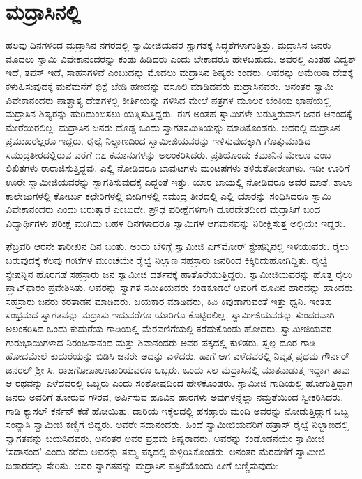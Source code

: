 
\chapter{ಮದ್ರಾಸಿನಲ್ಲಿ  }

 ಹಲವು ದಿನಗಳಿಂದ ಮದ್ರಾಸಿನ ನಗರದಲ್ಲಿ ಸ್ವಾಮೀಜಿಯವರ ಸ್ವಾಗತಕ್ಕೆ ಸಿದ್ಧತೆಗಳಾಗುತ್ತಿತ್ತು. ಮದ್ರಾಸಿನ ಜನರು ಮೊದಲು ಸ್ವಾಮಿ ವಿವೇಕಾನಂದರನ್ನು ಕಂಡು ಹಿಡಿದರು ಎಂದು ಬೇಕಾದರೂ ಹೇಳಬಹುದು. ಅವರಲ್ಲಿ ಎಂತಹ ವಿದ್ವತ್ ಇದೆ, ತಪಸ್ ಇದೆ, ಸಾಹಸಗಳಿವೆ ಎಂಬುದನ್ನು ಮೊದಲು ಮದ್ರಾಸಿನ ಶಿಷ್ಯರು ಕಂಡರು. ಅವರನ್ನು ಅಮೇರಿಕಾ ದೇಶಕ್ಕೆ ಕಳುಹಿಸುವುದಕ್ಕೆ ಮನೆಮನೆಗೆ ಭಿಕ್ಷೆ ಬೇಡಿ ಹಣವನ್ನು ವಸೂಲಿ ಮಾಡಿದವರು ಮದ್ರಾಸಿನವರು. ಅನಂತರ ಸ್ವಾಮಿ ವಿವೇಕಾನಂದರು ಪಾಶ್ಚಾತ್ಯ ದೇಶಗಳಲ್ಲಿ ಕೀರ್ತಿಯನ್ನು ಗಳಿಸಿದ ಮೇಲೆ ಪತ್ರಗಳ ಮೂಲಕ ಬೆಂಕಿಯ ಭಾಷೆಯಲ್ಲಿ ಮದ್ರಾಸಿನ ಶಿಷ್ಯರನ್ನು ಹುರಿದುಂಬಿಸಲು ಯತ್ನಿಸುತ್ತಿದ್ದರು. ಈಗ ಅಂತಹ ಸ್ವಾಮಿಗಳೇ ಬರುತ್ತಿರುವಾಗ ಜನರ ಆನಂದಕ್ಕೆ ಮೇರೆಯಿರಲಿಲ್ಲ. ಮದ್ರಾಸಿನ ಜನರು ದೊಡ್ಡ ಒಂದು ಸ್ವಾಗತಸಮಿತಿಯನ್ನು ಮಾಡಿಕೊಂಡರು. ಅದರಲ್ಲಿ ಮದ್ರಾಸಿನ ಪ್ರಮುಖರೆಲ್ಲರೂ ಇದ್ದರು. ರೈಲ್ವೆ ನಿಲ್ದಾಣದಿಂದ ಸ್ವಾಮೀಜಿಯವರನ್ನು ಇಳಿಸುವುದಕ್ಕಾಗಿ ಗೊತ್ತುಮಾಡಿದ ಸಮುದ್ರತೀರದಲ್ಲಿರುವ  ವರೆಗೆ ೧೭ ಕಮಾನುಗಳನ್ನು ಅಲಂಕರಿಸಿದರು. ಪ್ರತಿಯೊಂದು ಕಮಾನಿನ ಮೇಲೂ  ಎಂಬ ಲಿಖಿತಗಳು ರಾರಾಜಿಸುತ್ತಿದ್ದವು. ಎಲ್ಲಿ ನೋಡಿದರೂ ಬಾವುಟಗಳು ಮಂಟಪಗಳು ತಳಿರುತೋರಣಗಳು. ಇಡೀ ಊರಿಗೆ ಊರೇ ಸ್ವಾಮೀಜಿಯವರನ್ನು ಸ್ವಾಗತಿಸುವುದಕ್ಕೆ ಎದ್ದಂತೆ ಇತ್ತು. ಯಾರ ಬಾಯಲ್ಲಿ ನೋಡಿದರೂ ಅವರ ಮಾತೆ. ಶಾಲಾ ಕಾಲೇಜುಗಳಲ್ಲಿ ಕೋರ್ಟು ಕಛೇರಿಗಳಲ್ಲಿ ಬೀದಿಗಳಲ್ಲಿ ಸಮುದ್ರ ತೀರದಲ್ಲಿ ಎಲ್ಲಿ ಯಾರನ್ನು ಸಂಧಿಸಿದರೂ ಸ್ವಾಮಿ ವಿವೇಕಾನಂದರು ಎಂದು ಬರುತ್ತಾರೆ ಎಂಬುದೇ. ಪ್ರೌಢ ಪರೀಕ್ಷೆಗಳಿಗಾಗಿ ದೂರದೇಶದಿಂದ ಮದ್ರಾಸಿಗೆ ಬಂದ ವಿದ್ಯಾರ್ಥಿಗಳು ಪರೀಕ್ಷೆ ಮುಗಿದು ಬಹಳ ದಿನಗಳಾದರೂ ಸ್ವಾಮಿಗಳ ಆಗಮನವನ್ನು ನಿರೀಕ್ಷಿಸುತ್ತ ಅಲ್ಲಿಯೇ ಇದ್ದರು. 

 ಫೆಬ್ರವರಿ ಆರನೇ ತಾರೀಖಿನ ದಿನ ಬಂತು. ಅಂದು ಬೆಳಿಗ್ಗೆ ಸ್ವಾಮೀಜಿ ಎಗ್‍ಮೋರ್ ಸ್ಟೇಷನ್ನಿನಲ್ಲಿ ಇಳಿಯುವರು. ರೈಲು ಬರುವುದಕ್ಕೆ ಕೆಲವು ಗಂಟೆಗಳ ಮುಂಚೆಯೇ ರೈಲ್ವೆ ನಿಲ್ದಾಣ ಸಹಸ್ರಾರು ಜನರಿಂದ ಕಿಕ್ಕಿರಿದುಹೋಗಿದ್ದಿತು. ರೈಲ್ವೆ ಸ್ಟೇಷನ್ನಿನ ಹೊರಗಡೆ ಸಹಸ್ರಾರು ಜನ ಸ್ವಾಮೀಜಿ ದರ್ಶನಕ್ಕೆ ಹಾತೊರೆಯುತ್ತಿದ್ದರು. ಸ್ವಾಮೀಜಿಯವರನ್ನು ಹೊತ್ತ ರೈಲು ಪ್ಲಾಟ್‍ಫಾರಂ ಪ್ರವೇಶಿಸಿತು. ಅವರನ್ನು ಸ್ವಾಗತ ಸಮಿತಿಯವರು ಕಂಡಕೂಡಲೆ ಅವರಿಗೆ ಹೂವಿನ ಹಾರವನ್ನು ಹಾಕಿದರು. ಸಹಸ್ರಾರು ಜನರು ಕರತಾಡನ ಮಾಡಿದರು. ಜಯಕಾರ ಮಾಡಿದರು, ಕಿವಿ ಕಿವುಡಾಗುವಂತೆ ಇತ್ತು ಧ್ವನಿ. ಇಂತಹ ಸಂಭ್ರಮದ ಸ್ವಾಗತವನ್ನು ಮದ್ರಾಸು ಇದುವರೆಗೂ ಯಾರಿಗೂ ಕೊಟ್ಟಿರಲಿಲ್ಲ. ಸ್ವಾಮೀಜಿಯವರನ್ನು ಸುಂದರವಾಗಿ ಅಲಂಕರಿಸಿದ ಒಂದು ಕುದುರೆಯ ಗಾಡಿಯಲ್ಲಿ ಮೆರವಣಿಗೆಯಲ್ಲಿ ಕರೆದುಕೊಂಡು ಹೋದರು. ಸ್ವಾಮೀಜಿಯವರ ಗುರುಭಾಯಿಗಳಾದ ನಿರಂಜನಾನಂದ ಮತ್ತು ಶಿವಾನಂದರು ಅವರ ಪಕ್ಕದಲ್ಲಿ ಕುಳಿತರು. ಸ್ವಲ್ಪ ದೂರ ಗಾಡಿ ಹೋದಮೇಲೆ ಕುದುರೆಯನ್ನು ಬಿಡಿಸಿ ಜನರೇ ಅದನ್ನು ಎಳೆದರು. ಹಾಗೆ ಆಗ ಎಳೆದವರಲ್ಲಿ ನಿವೃತ್ತ ಪ್ರಥಮ ಗೌರ್ನರ್ ಜನರಲ್ ಶ‍್ರೀ ಸಿ. ರಾಜಗೋಪಾಲಾಚಾರಿಯವರೂ ಒಬ್ಬರು. ಒಂದು ಸಲ ಮದ್ರಾಸಿನಲ್ಲಿ ಮಾತನಾಡುತ್ತ ಇದ್ದಾಗ ತಾವು ಆ ರಥವನ್ನು ಎಳೆದವರಲ್ಲಿ ಒಬ್ಬರು ಎಂದು ಸಂತೋಷದಿಂದ ಹೇಳಿಕೊಂಡರು. ಸ್ವಾಮೀಜಿ ಗಾಡಿಯಲ್ಲಿ ಹೋಗುತ್ತಿದ್ದಾಗ ಜನರು ಅವರಿಗೆ ತೋರುವ ಗೌರವ, ಅರ್ಪಿಸುವ ಹೂವಿನ ಹಾರಗಳು ಅವುಗಳನ್ನೆಲ್ಲಾ ನಮ್ರತೆಯಿಂದ ಸ್ವೀಕರಿಸಿದರು. ಗಾಡಿ ಕ್ಯಾಸಲ್ ಕರ್ನನ್ ಕಡೆ ಹೋಯಿತು. ದಾರಿಯ ಇಕ್ಕೆಲದಲ್ಲಿ ಹಸಹ್ರಾರು ಮಂದಿ ಅವರನ್ನು ನೋಡುತ್ತಿದ್ದಾಗ ಒಬ್ಬ ಸಂನ್ಯಾಸಿ ಸ್ವಾಮೀಜಿ ಕಣ್ಣಿಗೆ ಬಿದ್ದರು. ಅವರೇ ಸದಾನಂದರು. ಹಿಂದೆ ಸ್ವಾಮೀಜಿಯವರಿಗೆ ಹತ್ರಾಸ್ ರೈಲ್ವೆ ನಿಲ್ದಾಣದಲ್ಲಿ ಸ್ವಾಗತವನ್ನು ಬಯಸಿದವರು, ಅನಂತರ ಅವರ ಪ್ರಥಮ ಶಿಷ್ಯರಾದರು. ಅವರನ್ನು ಕಂಡೊಡನೆಯೇ ಸ್ವಾಮೀಜಿ ‘ಸದಾನಂದ’ ಎಂದು ಕರೆದು ಅವರನ್ನು ತಮ್ಮ ಪಕ್ಕದಲ್ಲಿ ಕುಳ್ಳಿರಿಸಿಕೊಂಡರು. ಅನಂತರ ಮೆರವಣಿಗೆ ಸ್ವಾಮೀಜಿ ಬಿಡಾರವನ್ನು ಸೇರಿತು. ಅವರ ಸ್ವಾಗತವನ್ನು ಮದ್ರಾಸಿನ ಪತ್ರಿಕೆಯೊಂದು ಹೀಗೆ ಬಣ್ಣಿಸುವುದು: 

